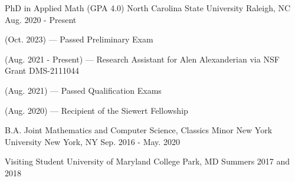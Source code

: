 

\begin{cventries}

  \cventry
    {PhD in Applied Math (GPA 4.0)} %
    {North Carolina State University} %
    {Raleigh, NC} %
    {Aug. 2020 - Present} %
    {
      \begin{cvitems} %
        \item {(Oct. 2023) --- Passed Preliminary Exam}
        \item {(Aug. 2021 - Present) --- Research Assistant for Alen Alexanderian via
        NSF Grant DMS-2111044}
        \item {(Aug. 2021) --- Passed Qualification Exams}
        \item {(Aug. 2020) --- Recipient of the Siewert Fellowship}
      \end{cvitems}
    }

  \cventry
    {B.A. Joint Mathematics and Computer Science, Classics Minor} %
    {New York University} %
    {New York, NY} %
    {Sep. 2016 - May. 2020} %
    {}

  \cventry
    {Visiting Student} %
    {University of Maryland} %
    {College Park, MD} %
    {Summers 2017 and 2018} %
    {}

%
\end{cventries}

